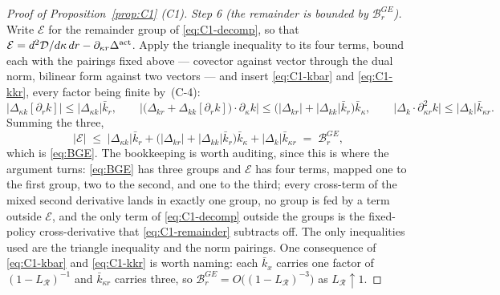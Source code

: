 \begin{proof}[Proof of Proposition~\ref{prop:C1} (C1)]
\emph{Step 6 (the remainder is bounded by $\mathcal B_r^{GE}$).} Write $\mathcal E$ for the
remainder group of \eqref{eq:C1-decomp}, so that
$\mathcal E = d^2\mathcal D/d\kappa\,dr - \partial_{\kappa r}\Delta^{\mathrm{act}}$. Apply the triangle inequality
to its four terms, bound each with the pairings fixed above --- covector against vector through the
dual norm, bilinear form against two vectors --- and insert \eqref{eq:C1-kbar} and
\eqref{eq:C1-kkr}, every factor being finite by~(C-4):
\[
\bigl\lvert\Delta_{\kappa k}[\partial_r k]\bigr\rvert \le \lvert\Delta_{\kappa k}\rvert\bar k_r,
\qquad
\bigl\lvert\bigl(\Delta_{kr}+\Delta_{kk}[\partial_r k]\bigr)\cdot\partial_\kappa k\bigr\rvert
\le \bigl(\lvert\Delta_{kr}\rvert + \lvert\Delta_{kk}\rvert\bar k_r\bigr)\bar k_\kappa,
\qquad
\bigl\lvert\Delta_k\cdot\partial^2_{\kappa r}k\bigr\rvert \le \lvert\Delta_k\rvert\bar k_{\kappa r}.
\]
Summing the three,
\begin{equation}
\label{eq:C1-remainder}
\bigl\lvert \mathcal E \bigr\rvert
\;\le\; \lvert\Delta_{\kappa k}\rvert\bar k_r
+ \bigl(\lvert\Delta_{kr}\rvert + \lvert\Delta_{kk}\rvert\bar k_r\bigr)\bar k_\kappa
+ \lvert\Delta_k\rvert\bar k_{\kappa r}
\;=\; \mathcal B_r^{GE},
\end{equation}
which is \eqref{eq:BGE}. The bookkeeping is worth auditing, since this is where the argument turns:
\eqref{eq:BGE} has three groups and $\mathcal E$ has four terms, mapped one to the first group, two
to the second, and one to the third; every cross-term of the mixed second derivative lands in
exactly one group, no group is fed by a term outside $\mathcal E$, and the only term of
\eqref{eq:C1-decomp} outside the groups is the fixed-policy cross-derivative that
\eqref{eq:C1-remainder} subtracts off. The only inequalities used are the triangle inequality and
the norm pairings. One consequence of \eqref{eq:C1-kbar} and \eqref{eq:C1-kkr} is worth naming: each
$\bar k_x$ carries one factor of $(1-L_{\mathcal R})^{-1}$ and $\bar k_{\kappa r}$ carries three, so
$\mathcal B_r^{GE} = O\bigl((1-L_{\mathcal R})^{-3}\bigr)$ as $L_{\mathcal R}\uparrow1$.


\end{proof}
